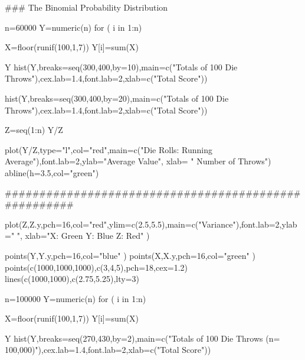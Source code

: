 ### The Binomial Probability Distribution

n=60000
Y=numeric(n)
for ( i in 1:n){

X=floor(runif(100,1,7))
Y[i]=sum(X)
}

Y
hist(Y,breaks=seq(300,400,by=10),main=c("Totals of 100 Die Throws"),cex.lab=1.4,font.lab=2,xlab=c("Total Score"))

hist(Y,breaks=seq(300,400,by=20),main=c("Totals of 100 Die Throws"),cex.lab=1.4,font.lab=2,xlab=c("Total Score"))



Z=seq(1:n)
Y/Z

plot(Y/Z,type="l",col="red",main=c("Die Rolls: Running Average"),font.lab=2,ylab="Average Value", xlab=
" Number of Throws")
abline(h=3.5,col="green")


#####################################################

plot(Z,Z.y,pch=16,col="red",ylim=c(2.5,5.5),main=c("Variance"),font.lab=2,ylab=" ", xlab="X: Green  Y: Blue  Z: Red" )

points(Y,Y.y,pch=16,col="blue" )
points(X,X.y,pch=16,col="green" )
points(c(1000,1000,1000),c(3,4,5),pch=18,cex=1.2)
lines(c(1000,1000),c(2.75,5.25),lty=3)



n=100000
Y=numeric(n)
for ( i in 1:n){

X=floor(runif(100,1,7))
Y[i]=sum(X)
}

Y
hist(Y,breaks=seq(270,430,by=2),main=c("Totals of 100 Die Throws (n= 100,000)"),cex.lab=1.4,font.lab=2,xlab=c("Total Score")) 